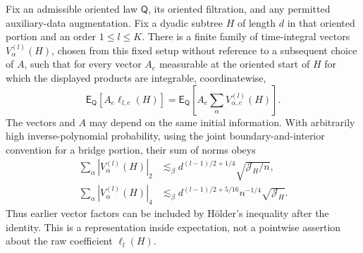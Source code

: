 \begin{lemma}\label{score:raw-projection}
Fix an admissible oriented law $\mathsf Q$, its oriented filtration, and
any permitted auxiliary-data augmentation.  Fix a dyadic subtree $H$ of
length $d$ in that oriented portion and an order $1\le l\le K$.  There is
a finite family of time-integral vectors $V_\alpha^{(l)}(H)$, chosen from
this fixed setup without reference to a subsequent choice of $A$, such that
for every vector $A_e$ measurable at the oriented start of $H$ for which
the displayed products are integrable, coordinatewise,
\begin{equation}\label{score:raw-representation}
 \mathsf E_{\mathsf Q}[A_e\ell_{l,e}(H)]
       =\mathsf E_{\mathsf Q}\left[A_e\sum_\alpha V_{\alpha,e}^{(l)}(H)\right].
\end{equation}
The vectors and $A$ may depend on the same initial information.  With arbitrarily high
inverse-polynomial probability, using the joint boundary-and-interior
convention for a bridge portion, their sum of norms obeys
\begin{equation}\label{score:raw-projection-bounds}
 \begin{split}
 \sum_\alpha|V_\alpha^{(l)}(H)|_2
       &\lesssim_\beta d^{(l-1)/2+1/4}\sqrt{\mathcal J_H/n},\\
 \sum_\alpha|V_\alpha^{(l)}(H)|_4
       &\lesssim_\beta d^{(l-1)/2+5/16}n^{-1/4}\sqrt{\mathcal J_H}.
 \end{split}
\end{equation}
Thus earlier vector factors can be included by H\"older's inequality after
the identity.  This is a representation inside expectation, not a
pointwise assertion about the raw coefficient $\ell_l(H)$.
\end{lemma}

